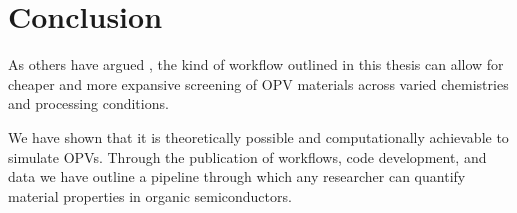 \chapter{Conclusion}
\label{conclusion}

As others have argued \cite{Evans2016}\cite{Gali2017}\cite{Jones2017}, the kind of workflow outlined in this thesis
can allow for cheaper and more expansive screening of OPV materials across varied chemistries and processing
conditions. 


We have shown that it is theoretically possible and computationally
achievable to simulate OPVs. 
Through the publication
of workflows, code development, and data we have outline a 
pipeline through which any researcher can quantify material properties in
organic semiconductors. 






